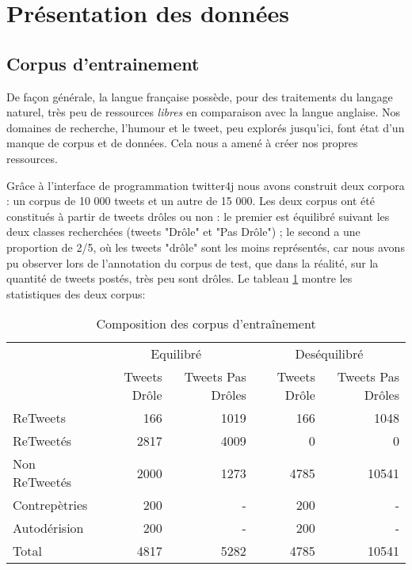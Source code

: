 \documentclass[10pt,a4paper,twoside]{article}
\begin{document}
\section{Présentation des données}
\label{corpus}
\subsection{Corpus d'entrainement}

De façon générale, la langue française possède, pour des traitements du langage naturel, très peu de ressources \textit{libres} en comparaison avec la langue anglaise. Nos domaines de recherche, l'humour et le tweet, peu explorés jusqu'ici, font état d'un manque de corpus et de données. Cela nous a amené à créer nos propres ressources.

Grâce à l'interface de programmation twitter4j nous avons construit deux corpora : un corpus de 10 000 tweets et un autre de 15 000. Les deux corpus ont été constitués à partir de tweets drôles ou non : le premier est équilibré suivant les deux classes recherchées (tweets "Drôle" et "Pas Drôle") ; le second a une proportion de 2/5, où les tweets "drôle" sont les moins représentés, car nous avons pu observer lors de l'annotation du corpus de test, que dans la réalité, sur la quantité de tweets postés, très peu sont drôles. Le tableau \ref{corpus} montre les statistiques des deux corpus: 

\begin{table}[!h]
\centering
	\begin{tabular}{lrrrr}
	\toprule
	& \multicolumn{2}{c}{Equilibré}  & \multicolumn{2}{c}{Deséquilibré}\\
	\cmidrule(r){2-3} \cmidrule(r){4-5}

	& Tweets Drôle & Tweets Pas Drôles &  Tweets Drôle & Tweets Pas Drôles \\
	\midrule
	 ReTweets & 166 & 1019 & 166 & 1048 \\
	
	 ReTweetés & 2817 & 4009 & 0 & 0 \\
	
	Non ReTweetés & 2000 & 1273 & 4785 & 10541 \\
	
	Contrepètries & 200 & - & 200 & - \\
	Autodérision & 200 & - & 200 & - \\
	 \midrule
	Total & 4817 & 5282 & 4785 &  10541 \\
	\bottomrule
	\end{tabular}
\caption{Composition des corpus d'entraînement}
\label{corpus}
\end{table}
\end{document}
